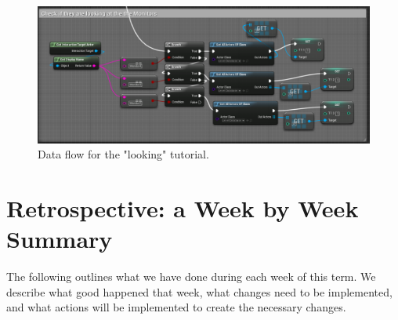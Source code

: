 \documentclass[onecolumn, draftclsnofoot,10pt, compsoc]{IEEEtran}
\begin{document}
\begin{figure}[ht!]
    \centering
    \includegraphics[scale=0.55]{looking_tutorial.png}
    \caption{Data flow for the "looking" tutorial.}
    \label{fig:tutorial1}
\end{figure}

\newpage

\section{Retrospective: a Week by Week Summary}

The following outlines what we have done during each week of this term. We describe what good happened that week, what changes need to be implemented, and what actions will be implemented to create the necessary changes.
\end{document}
